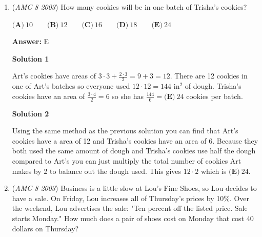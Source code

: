 \begin{enumerate}
 $\textbf{(A)}\ 18\qquad\textbf{(B)}\ 25\qquad\textbf{(C)}\ 40\qquad\textbf{(D)}\ 75\qquad\textbf{(E)}\ 90$

 \textbf{Answer: }C



\textbf{Solution}

The area of one of Art's cookies is $3 \cdot 3 + \frac{2 \cdot 3}{2}=9+3=12$. As he has $12$ cookies in a batch, the amount of dough each person used is $12 \cdot 12=144$. Roger's cookies have an area of $\frac{144}{2 \cdot 4}=\frac{144}{8}= 18$ cookies in  a batch. In total, the amount of money Art will earn is $12 \cdot 60=720$. Thus, the amount Roger would need to charge per cookie is $\frac{720}{18}=\boxed{\textbf{(C)}\ 40}$.

 


	\item (\textit{AMC 8 2003}) How many cookies will be in one batch of Trisha's cookies?


 $\textbf{(A)}\ 10\qquad\textbf{(B)}\ 12\qquad\textbf{(C)}\ 16\qquad\textbf{(D)}\ 18\qquad\textbf{(E)}\ 24$

 \textbf{Answer: }E



\textbf{Solution 1}

Art's cookies have areas of $3 \cdot 3 + \frac{2 \cdot 3}{2}=9+3=12$. There are 12 cookies in one of Art's batches so everyone used $12 \cdot 12=144 \text{ in}^2$ of dough. Trisha's cookies have an area of $\frac{3 \cdot 4}{2}=6$ so she has $\frac{144}{6}=\boxed{\textbf{(E)}\ 24}$ cookies per batch.

 



\textbf{Solution 2}

Using the same method as the previous solution you can find that Art's cookies have a area of 12 and Trisha's cookies have an area of 6. Because they both used the same amount of dough and Trisha's cookies use half the dough compared to Art's you can just multiply the total number of cookies Art makes by 2 to balance out the dough used. This gives $12 \cdot 2$ which is $\boxed{\textbf{(E)}\ 24}$.

 


	\item (\textit{AMC 8 2003}) Business is a little slow at Lou's Fine Shoes, so Lou decides to have a sale. On Friday, Lou increases all of Thursday's prices by 10\%. Over the weekend, Lou advertises the sale: "Ten percent off the listed price. Sale starts Monday." How much does a pair of shoes cost on Monday that cost 40 dollars on Thursday?



\end{enumerate}
